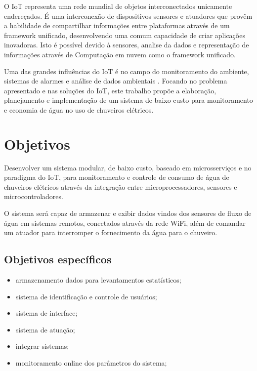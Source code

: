 O IoT representa uma rede mundial de objetos interconectados unicamente endereçados. É uma interconexão de dispositivos sensores e atuadores que provêm a habilidade de compartilhar informações entre plataformas através de um framework unificado, desenvolvendo uma comum capacidade de criar aplicações inovadoras. Isto é possível devido à sensores, analise da dados e representação de informações através de Computação em nuvem como o framework unificado. \cite{RisteskaStojkoska2017}

Uma das grandes influências do IoT é no campo do monitoramento do ambiente, sistemas de alarmes e análise de dados ambientais \cite{Perumal2016}. Focando no problema apresentado e nas soluções do IoT, este trabalho propõe a elaboração, planejamento e implementação de um sistema de baixo custo para monitoramento e economia de água no uso de chuveiros elétricos.



\section{Objetivos}

Desenvolver um sistema modular, de baixo custo, baseado em microsserviços e no paradigma do IoT, para monitoramento e controle de consumo de água de chuveiros elétricos através da integração entre microprocessadores, sensores e microcontroladores. 

O sistema será capaz de armazenar e exibir dados vindos dos sensores de fluxo de água em sistemas remotos, conectados através da rede WiFi, além de comandar um atuador para interromper o fornecimento da água para o chuveiro.

\subsection{Objetivos específicos}

\begin{itemize}
	\item armazenamento dados para levantamentos estatísticos;
	\item sistema de identificação e controle de usuários;
	\item sistema de interface;
	\item sistema de atuação;
	\item integrar sistemas;
	\item monitoramento online dos parâmetros do sistema;
\end{itemize}


